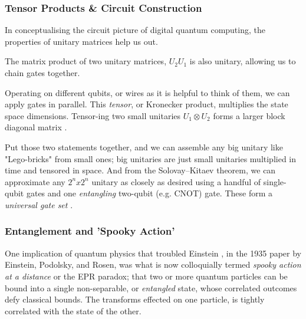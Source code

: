 \subsubsection{Tensor Products \& Circuit Construction}

In conceptualising the circuit picture of digital quantum computing, the properties of unitary matrices help us out.

The matrix product of two unitary matrices, $U_2U_1$ is also unitary, allowing us to chain gates together.

Operating on different qubits, or wires as it is helpful to think of them, we can apply gates in parallel.
This \emph{tensor}, or Kronecker product, multiplies the state space dimensions.  
Tensor-ing two small unitaries $U_1 \otimes U_2$ forms a larger block diagonal matrix \cite{Nielsen:2010}.

Put those two statements together, and we can assemble any big unitary like "Lego-bricks" from small ones;
big unitaries are just small unitaries multiplied in time and tensored in space.
And from the Solovay–Kitaev theorem, we can approximate any $2^n x 2^n$ unitary as closely as desired
using a handful of single-qubit gates and one \emph{entangling} two-qubit (e.g. CNOT) gate.
These form a \emph{universal gate set} \cite{Nielsen:2010}.





\subsubsection{Entanglement and 'Spooky Action'}

One implication of quantum physics that troubled Einstein \cite{Einstein:1935},
in the 1935 paper  by Einstein, Podolsky, and Rosen, 
was what is now colloquially termed \emph{spooky action at a distance} or the EPR paradox;
that two or more quantum particles can be bound into a single non-separable, or \emph{entangled} state, 
whose correlated outcomes defy classical bounds.  
The transforms effected on one particle, is tightly correlated with the state of the other.

